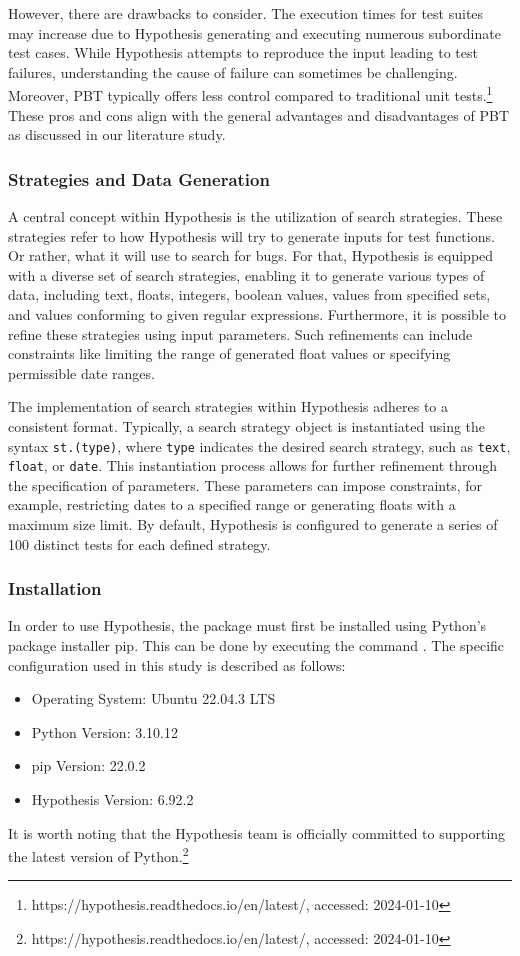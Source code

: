 \documentclass[runningheads]{llncs}
\begin{document}
However, there are drawbacks to consider. The execution times for test suites may increase due to Hypothesis generating and executing numerous subordinate test cases. While Hypothesis attempts to reproduce the input leading to test failures, understanding the cause of failure can sometimes be challenging. Moreover, PBT typically offers less control compared to traditional unit tests.\footnote{https://hypothesis.readthedocs.io/en/latest/, accessed: 2024-01-10} These pros and cons align with the general advantages and disadvantages of PBT as discussed in our literature study.

\subsubsection{Strategies and Data Generation}
A central concept within Hypothesis is the utilization of search strategies. These strategies refer to how Hypothesis will try to generate inputs for test functions. Or rather, what it will use to search for bugs. For that, Hypothesis is equipped with a diverse set of search strategies, enabling it to generate various types of data, including text, floats, integers, boolean values, values from specified sets, and values conforming to given regular expressions. Furthermore, it is possible to refine these strategies using input parameters. Such refinements can include constraints like limiting the range of generated float values or specifying permissible date ranges.

The implementation of search strategies within Hypothesis adheres to a consistent format. Typically, a search strategy object is instantiated using the syntax \texttt{st.(type)}, where \texttt{type} indicates the desired search strategy, such as \texttt{text}, \texttt{float}, or \texttt{date}. This instantiation process allows for further refinement through the specification of parameters. These parameters can impose constraints, for example, restricting dates to a specified range or generating floats with a maximum size limit. By default, Hypothesis is configured to generate a series of 100 distinct tests for each defined strategy.

\subsubsection{Installation}
In order to use Hypothesis, the package must first be installed using Python's package installer pip. This can be done by executing the command . The specific configuration used in this study is described as follows:
\begin{itemize}
  \item Operating System: Ubuntu 22.04.3 LTS
  \item Python Version: 3.10.12
  \item pip Version: 22.0.2
  \item Hypothesis Version: 6.92.2
\end{itemize}
It is worth noting that the Hypothesis team is officially committed to supporting the latest version of Python.\footnote{https://hypothesis.readthedocs.io/en/latest/, accessed: 2024-01-10}
\end{document}
